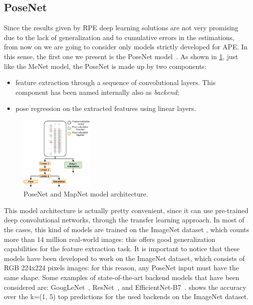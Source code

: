 \subsection{PoseNet}
Since the results given by RPE deep learning solutions are not very promising due to the lack of generalization and to cumulative errors in the estimations, from now on we are going to consider only models strictly developed for APE.
In this sense, the first one we present is the PoseNet model~\cite{9348762}.
As shown in \cref{fig:mapnet-posenet-structure}, just like the MeNet model, the PoseNet is made up by two components:
\begin{itemize}
    \item feature extraction through a sequence of convolutional layers. This component has been named internally also as \emph{backend};
    \item pose regression on the extracted features using linear layers.
\end{itemize}

\begin{figure}[htbp]
    \begin{center}
        \includegraphics[width=0.32\textwidth]{./imgs/mapnet_posenet_structure.png}
    \end{center}
    \caption{PoseNet and MapNet model architecture.}
    \label{fig:mapnet-posenet-structure}
\end{figure}

This model architecture is actually pretty convenient, since it can use pre-trained deep convolutional networks, through the transfer learning approach. In most of the cases, this kind of models are trained on the ImageNet dataset \cite{imagenet}, which counts more than 14 million real-world images: this offers good generalization capabilities for the feature extraction task.
It is important to notice that these models have been developed to work on the ImageNet dataset, which consists of RGB 224x224 pixels images: for this reason, any PoseNet input must have the same shape. 
Some examples of state-of-the-art backend models that have been considered are: GoogLeNet~\cite{googlenet}, ResNet~\cite{resnet}, and EfficientNet-B7~\cite{efficientnet}.  shows the accuracy over the k=(1, 5) top predictions for the used backends on the ImageNet dataset.

